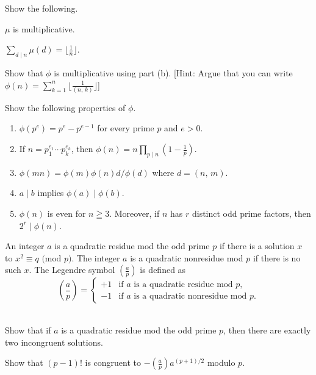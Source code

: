 \documentclass[a4paper,11pt]{article}
\theoremstyle{mythm}
\theoremstyle{mydef}
\renewcommand{\pmod}[1]{\text{ (mod $#1$)}}
\begin{document}
 Show the following.
\begin{enumerate*}[{\bf (a)}]
\item $\mu$ is multiplicative.
\item $\sum_{d \mid n}\mu(d)=\lfloor \frac{1}{n} \rfloor$.
\item Show that $\phi$ is multiplicative using part (b). [Hint: Argue that you
  can write $\phi(n)=\sum_{k = 1}^n\lfloor \frac{1}{(n,\,k)} \rfloor$] \\
\end{enumerate*}

 Show the following properties of $\phi$.
\begin{enumerate}[{\bf (a)}]
\item $\phi(p^e)=p^e-p^{e-1}$ for every prime $p$ and $e>0$.
\item If $n=p_1^{e_1} \cdots p_k^{e_k}$, then $\phi(n)=n\prod_{p \mid
    n}(1-\frac{1}{p})$.
\item $\phi(mn)=\phi(m)\phi(n)d/\phi(d)$ where $d=(n,\,m)$.
\item $a \mid b$ implies $\phi(a) \mid \phi(b)$.
\item $\phi(n)$ is even for $n \geqq 3$. Moreover, if $n$ has $r$ distinct odd
  prime factors, then $2^r \mid \phi(n)$. \\
\end{enumerate}

An integer $a$ is a quadratic residue mod the odd prime $p$ if there is a
solution $x$ to $x^2 \equiv q \pmod{p}$. The integer $a$ is a quadratic
nonresidue mod $p$ if there is no such $x$. The Legendre symbol $(\frac{a}{p})$
is defined as
\[
  \left( \frac{a}{p} \right) =
  \begin{cases}
    +1 & \text{if $a$ is a quadratic residue mod $p$,} \\
    -1 & \text{if $a$ is a quadratic nonresidue mod $p$.}
  \end{cases}
\] \\

\begin{enumerate*}[{\bf (a)}]
\item Show that if $a$ is a quadratic residue mod the odd prime $p$, then there
  are exactly two incongruent solutions.
\item Show that $(p-1)!$ is congruent to $-\left( \frac{a}{p}
  \right)a^{(p+1)/2}$ modulo $p$.
\end{enumerate*}
\end{document}
